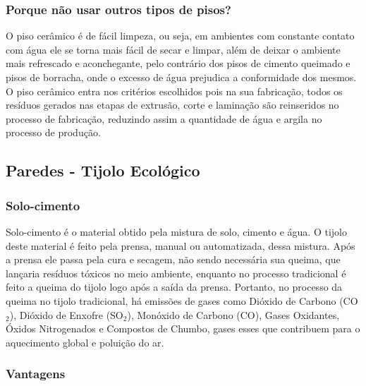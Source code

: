\subsubsection*{\textbf{Porque não usar outros tipos de pisos?}}

	O piso cerâmico é de fácil limpeza, ou seja, em ambientes com constante contato com água ele se torna mais fácil de secar e limpar, além de deixar o ambiente mais refrescado e aconchegante, pelo contrário dos pisos de cimento queimado e pisos de borracha, onde o excesso de água prejudica a conformidade dos mesmos. O piso cerâmico entra nos critérios escolhidos pois na sua fabricação, todos os resíduos gerados nas etapas de extrusão, corte e laminação são reinseridos no processo de fabricação, reduzindo assim a quantidade de água e argila no processo de produção.


\subsection{Paredes - Tijolo Ecológico }

\subsubsection*{\textbf{Solo-cimento}}
	
	Solo-cimento é o material obtido pela mistura de solo, cimento e água. O tijolo deste material é feito pela prensa, manual ou automatizada, dessa mistura. Após a prensa ele passa pela cura e secagem, não sendo necessária sua queima, que lançaria resíduos tóxicos no meio ambiente, enquanto no processo tradicional é feito a queima do tijolo logo após a saída da prensa. Portanto, no processo da queima no tijolo tradicional, há emissões de gases como Dióxido de Carbono (CO$_2$), Dióxido de Enxofre (SO$_2$), Monóxido de Carbono (CO), Gases Oxidantes, Óxidos Nitrogenados e Compostos de Chumbo, gases esses que contribuem para o aquecimento global e poluição do ar\cite{1980PORTLAND}.\\

\subsubsection*{\textbf{Vantagens}}
	
